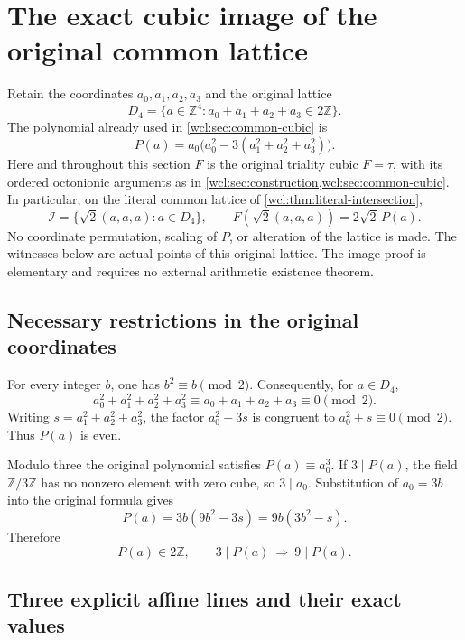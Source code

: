 \section{The exact cubic image of the original common lattice}
\label{d4i:sec:complete-image}

Retain the coordinates $a_0,a_1,a_2,a_3$ and the original lattice
\[
 D_4=\{a\in\mathbb Z^4:a_0+a_1+a_2+a_3\in2\mathbb Z\}.
 \label{d4i:eq:original-domain}\tag{D4I1}
\]
The polynomial already used in \cref{wcl:sec:common-cubic} is
\[
 P(a)=a_0\bigl(a_0^2-3(a_1^2+a_2^2+a_3^2)\bigr).
 \label{d4i:eq:original-polynomial}\tag{D4I2}
\]
Here and throughout this section $F$ is the original triality cubic
$F=\tau$, with its ordered octonionic arguments as in
\cref{wcl:sec:construction,wcl:sec:common-cubic}. In particular, on the
literal common lattice of \cref{wcl:thm:literal-intersection},
\[
 \mathcal I=\{\sqrt2(a,a,a):a\in D_4\},\qquad
 F(\sqrt2(a,a,a))=2\sqrt2\,P(a).
 \label{d4i:eq:retained-cubic}\tag{D4I3}
\]
No coordinate permutation, scaling of $P$, or alteration of the lattice
is made. The witnesses below are actual points of this original lattice.
The image proof is elementary and requires no external arithmetic
existence theorem.

\subsection{Necessary restrictions in the original coordinates}
\label{d4i:sec:necessary}

For every integer $b$, one has $b^2\equiv b\pmod2$. Consequently,
for $a\in D_4$,
\[
 a_0^2+a_1^2+a_2^2+a_3^2
 \equiv a_0+a_1+a_2+a_3\equiv0\pmod2.
\]
Writing $s=a_1^2+a_2^2+a_3^2$, the factor $a_0^2-3s$ is congruent
to $a_0^2+s\equiv0\pmod2$. Thus $P(a)$ is even.

Modulo three the original polynomial satisfies $P(a)\equiv a_0^3$.
If $3\mid P(a)$, the field $\mathbb Z/3\mathbb Z$ has no nonzero
element with zero cube, so $3\mid a_0$. Substitution of $a_0=3b$
into the original formula gives
\[
 P(a)=3b(9b^2-3s)=9b(3b^2-s).
 \label{d4i:eq:three-divisibility}\tag{D4I4}
\]
Therefore
\[
 P(a)\in2\mathbb Z,\qquad
                 3\mid P(a)\ \Longrightarrow\ 9\mid P(a).
 \label{d4i:eq:necessary-restrictions}\tag{D4I5}
\]

\subsection{Three explicit affine lines and their exact values}
\label{d4i:sec:three-lines}

